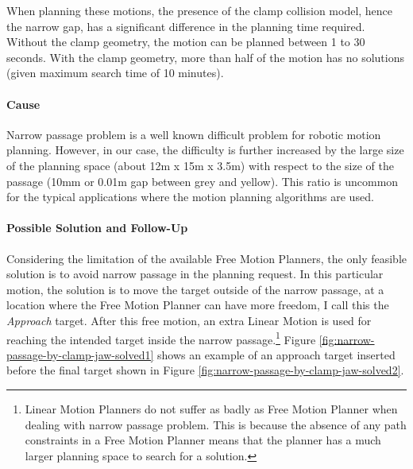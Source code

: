 When planning these motions, the presence of the clamp collision model, hence the narrow gap, has a significant difference in the planning time required. Without the clamp geometry, the  motion can be planned between 1 to 30 seconds. With the clamp geometry, more than half of the motion has no solutions (given maximum search time of 10 minutes).

\paragraph{Cause}

Narrow passage problem is a well known difficult problem for robotic motion planning. However, in our case, the difficulty is further increased by the large size of the planning space (about 12m x 15m x 3.5m) with respect to the size of the passage (10mm or 0.01m gap between grey and yellow). This ratio is uncommon for the typical applications where the motion planning algorithms are used.

\paragraph{Possible Solution and Follow-Up}

Considering the limitation of the available Free Motion Planners, the only feasible solution is to avoid narrow passage in the planning request. In this particular  motion, the solution is to move the target outside of the narrow passage, at a location where the Free Motion Planner can have more freedom, I call this the \textit{Approach} target. After this free motion, an extra Linear Motion is used for reaching the intended target inside the narrow passage.\footnote{Linear Motion Planners do not suffer as badly as Free Motion Planner when dealing with narrow passage problem. This is because the absence of any path constraints in a Free Motion Planner means that the planner has a much larger planning space to search for a solution.}
Figure \ref{fig:narrow-passage-by-clamp-jaw-solved1} shows an example of an approach target inserted before the final target shown in Figure \ref{fig:narrow-passage-by-clamp-jaw-solved2}.

